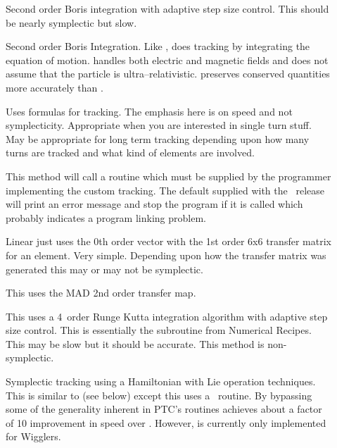 \begin{description}
\item[]
Second order Boris integration\cite{b:boris} with adaptive step size control.
This should be nearly symplectic but slow.

\item[]
Second order Boris Integration\cite{b:boris}. Like ,
 does tracking by integrating the equation of
motion.  handles both electric and magnetic fields and does
not assume that the particle is ultra--relativistic.  preserves
conserved quantities more accurately than .

\item[]
Uses formulas for tracking. The emphasis here is on speed and not
symplecticity. Appropriate when you are interested in single turn
stuff. May be appropriate for long term tracking depending upon how
many turns are tracked and what kind of elements are involved. 

\item[]
This method will call a routine  which must be
supplied by the programmer implementing the custom tracking. The
default  supplied with the \bmad\ release will print
an error message and stop the program if it is called which probably
indicates a program linking problem.

\item[]
Linear just uses the 0th order vector with the 1st order 6x6 transfer
matrix for an element. Very simple.  Depending upon how the transfer
matrix was generated this may or may not be symplectic.

\item[]
This uses the MAD 2nd order transfer map.

\item[]
This uses a 4\Th\ order Runge Kutta integration algorithm with adaptive
step size control.  This is essentially the  subroutine
from Numerical Recipes\cite{b:nr}. This may be slow but it should be
accurate. This method is non-symplectic.

\item[]
Symplectic tracking using a Hamiltonian with Lie operation techniques.
This is similar to  (see below) except this uses a
\bmad\ routine. By bypassing some of the generality inherent in PTC's routines
 achieves about a factor of 10 improvement in speed over
. However,  is
currently only implemented for Wigglers.


\end{description}
